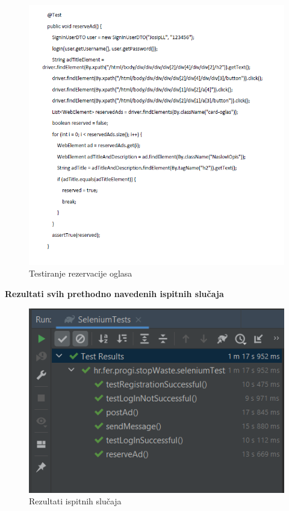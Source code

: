 			\begin{figure}[H]
				\includegraphics[scale=1.1]{slike/sel6.PNG} %
				\centering
				\caption{Testiranje rezervacije oglasa}
				\label{fig:sel6}
			\end{figure}
		
		
			\textbf{Rezultati svih prethodno navedenih ispitnih slučaja }
		
		\begin{figure}[H]
			\includegraphics[scale=0.8]{slike/rezultati.PNG} %
			\centering
			\caption{Rezultati ispitnih slučaja}
			\label{fig:rez}
		\end{figure} 
			\eject 
			
